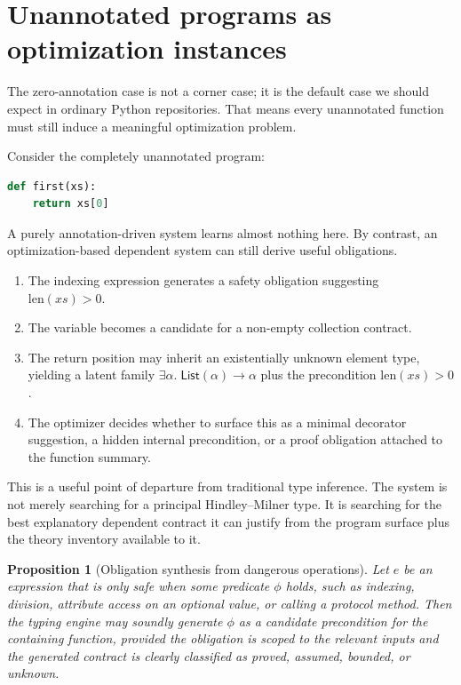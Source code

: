 \documentclass[11pt]{article}
\newcommand{\py}[1]{\texttt{\detokenize{#1}}}
\theoremstyle{definition}
\theoremstyle{plain}
\newtheorem{proposition}[definition]{Proposition}
\begin{document}
\section{Unannotated programs as optimization instances}

The zero-annotation case is not a corner case; it is the default case we should
expect in ordinary Python repositories. That means every unannotated function
must still induce a meaningful optimization problem.

Consider the completely unannotated program:
\begin{lstlisting}[style=deppy,language=Python]
def first(xs):
    return xs[0]
\end{lstlisting}
A purely annotation-driven system learns almost nothing here. By contrast, an
optimization-based dependent system can still derive useful obligations.

\begin{enumerate}[label=\arabic*.]
  \item The indexing expression generates a safety obligation suggesting
  \(\mathrm{len}(xs) > 0\).
  \item The variable \py{xs} becomes a candidate for a non-empty collection
  contract.
  \item The return position may inherit an existentially unknown element type,
  yielding a latent family \(\exists \alpha.\; \mathsf{List}(\alpha) \to \alpha\)
  plus the precondition \(\mathrm{len}(xs) > 0\).
  \item The optimizer decides whether to surface this as a minimal
  \py{@deppy.requires("len(xs) > 0")} decorator suggestion, a hidden internal
  precondition, or a proof obligation attached to the function summary.
\end{enumerate}

This is a useful point of departure from traditional type inference. The system
is not merely searching for a principal Hindley--Milner type. It is searching
for the best explanatory dependent contract it can justify from the program
surface plus the theory inventory available to it.

\begin{proposition}[Obligation synthesis from dangerous operations]
Let $e$ be an expression that is only safe when some predicate $\phi$ holds,
such as indexing, division, attribute access on an optional value, or calling a
protocol method. Then the typing engine may soundly generate $\phi$ as a
candidate precondition for the containing function, provided the obligation is
scoped to the relevant inputs and the generated contract is clearly classified as
proved, assumed, bounded, or unknown.
\end{proposition}
\end{document}
